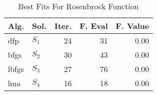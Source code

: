\begin{table}[H]
\centering
\caption{Best Fits For Rosenbrock Function}
\label{solutions:rosenbrock2d}
\begin{tabular}{llrrr}
\toprule
 Alg. &    Sol. &  Iter. &  F. Eval &  F. Value \\
\midrule
  dfp & $S_{1}$ &     24 &       31 &      0.00 \\
 bfgs & $S_{2}$ &     30 &       43 &      0.00 \\
lbfgs & $S_{3}$ &     27 &       76 &      0.00 \\
  lma & $S_{4}$ &     16 &       18 &      0.00 \\
\bottomrule
\end{tabular}
\end{table}
